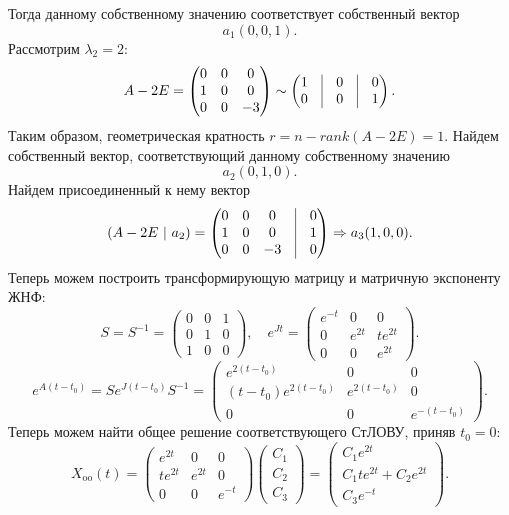 \documentclass[a4paper, 12pt]{article}
\begin{document}
Тогда данному собственному значению соответствует собственный вектор $$a_1(0,0,1).$$
Рассмотрим $\lambda_2 = 2$:
$$A - 2E = \begin{pmatrix}
	0 & 0 & 0\\
	1 & 0 & 0\\
	0 & 0 & -3
\end{pmatrix}\sim \begin{pmatrix}
1 & \vline & 0 & \vline & 0\\
0 & \vline & 0 & \vline & 1
\end{pmatrix}.$$
Таким образом, геометрическая кратность $r = n - rank(A-2E) = 1$. Найдем собственный вектор, соответствующий данному собственному значению $$a_2(0,1,0).$$
Найдем присоединенный к нему вектор $$(A-2E\ |\ a_2) = \begin{pmatrix}
	0 & 0 & 0 & \vline & 0\\
	1 & 0 & 0 & \vline & 1\\
	0 & 0 & -3 & \vline & 0
\end{pmatrix}\Rightarrow a_3(1,0,0).$$
Теперь можем построить трансформирующую матрицу и матричную экспоненту ЖНФ:
$$S = S^{-1} = \begin{pmatrix}
	0 & 0 & 1\\
	0 & 1 & 0\\
	1 & 0 & 0
\end{pmatrix},\quad e^{Jt} = \begin{pmatrix}
e^{-t} & 0 & 0\\
0 & e^{2t} & te^{2t}\\
0 & 0 & e^{2t}
\end{pmatrix}.$$
$$e^{A(t-t_0)} =Se^{J(t-t_0)}S^{-1}= \begin{pmatrix}
	e^{2(t-t_0)} & 0 & 0\\
	(t-t_0) e^{2(t-t_0)} & e^{2(t-t_0)} & 0\\
	0 & 0 & e^{-(t-t_0)}
\end{pmatrix}.$$
Теперь можем найти общее решение соответствующего СтЛОВУ, приняв $t_0 = 0$: $$X_{\text{oo}}(t) = \begin{pmatrix}
	e^{2t} & 0 & 0\\
	t e^{2t} & e^{2t} & 0\\
	0 & 0 & e^{-t}
\end{pmatrix}\begin{pmatrix}
C_1\\C_2\\C_3
\end{pmatrix} = \begin{pmatrix}
C_1e^{2t}\\
C_1te^{2t} + C_2e^{2t}\\
C_3e^{-t}
\end{pmatrix}.$$
\end{document}
